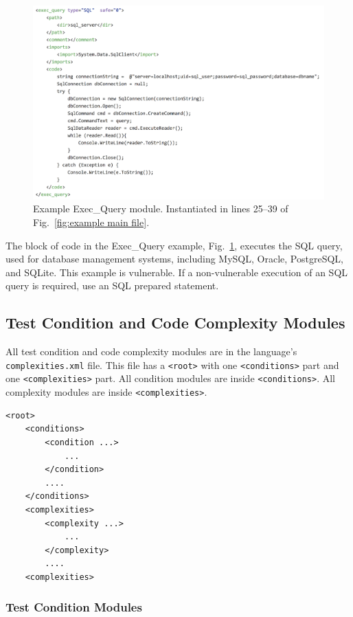 \documentclass[12pt]{article}
\begin{document}
\begin{figure}[htbp]
  \includegraphics[width=\linewidth]{fig_Exec_Query_file.png}
  \caption{Example Exec\_Query module. Instantiated in lines 25--39 of
    Fig.~\ref{fig:example main file}.}
  \label{fig:example exec-query file}
\end{figure}

The block of code in the Exec\_Query example, 
Fig.~\ref{fig:example exec-query file}, executes the SQL query, used 
for database management
systems, including MySQL, Oracle, PostgreSQL, and SQLite.  This example is
vulnerable.  If a non-vulnerable execution of an SQL query is required,
use an SQL prepared statement.


\subsection{Test Condition and Code Complexity Modules}

All test condition and code complexity modules are in the 
language's \verb|complexities.xml| file.  This file has
a \verb|<root>| with one \verb|<conditions>| part and one
\verb|<complexities>| part.
All condition modules are inside \verb|<conditions>|.  All
complexity modules are inside \verb|<complexities>|.

\begin{verbatim}
<root>
    <conditions>
        <condition ...>
            ...
        </condition>
        ....
    </conditions>
    <complexities>
        <complexity ...>
            ...
        </complexity>
        ....
    <complexities>
\end{verbatim}

\subsubsection{Test Condition Modules}
\label{sec: condition modules}
\end{document}
